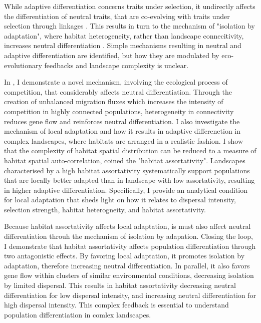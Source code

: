 % 
While adaptive differentiation concerns traits under selection, it undirectly affects the differentiation of neutral traits, that are co-evolving with traits under selection through linkages \xxx. This results in turn to the mechanism of "isolation by adaptation", where habitat heterogeneity, rather than landscape connecitivity, increases neutral differentiation \cite{nosil2008}. 
% 
Simple mechanisms resulting in neutral and adaptive differentiation are identified, but how they are modulated by eco-evolutionary feedbacks and landscape complexity is unclear. %

In \chapi, I demonstrate a novel mechanism, involving the ecological process of competition, that considerably affects neutral differentiation. Through the creation of unbalanced migration fluxes which increases the intensity of competition in highly connected populations, heterogeneity in connectivity reduces gene flow and reinforces neutral differentiation. %
% 
I also investigate the mechanism of local adaptation and how it results in adaptive differenetion in complex landscapes, where habitats are arranged in a realistic fashion. I show that the complexity of habitat spatial distribution can be reduced to a measure of habitat spatial auto-correlation, coined the "habitat assortativity". Landscapes characterised by a high habitat assortativity systematically support populations that are locally better adapted than in landscape with low assortativity, resulting in higher adaptive differentiation. Specifically, I provide an analytical condition for local adaptation that sheds light on how it relates to dispersal intensity, selection strength, habitat heterogneity, and habitat assortativity.

Because habitat assortativity affects local adaptation, is must also affect neutral differentiation throuh the mechanism of isolation by adapation. Closing the loop, I demonstrate that habitat assortativity affects population differentiation through two antagonistic effects. By favoring local adaptation, it promotes isolation by adaptation, therefore increasing neutral differentiation. In parallel, it also favors gene flow within clusters of similar environmental conditions, decreasing isolation by limited dispersal. This results in habitat assortativity decreasing neutral differentiation for low dispersal intensity, and increasing neutral differentiation for high dispersal intensity.
% 
This complex feedback is essential to understand population differentiation in comlex landscapes.

